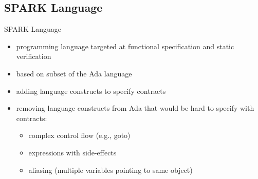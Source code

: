 \subsection{SPARK Language}
\begin{frame}{\insertsubsection}
	\begin{fancycolumns}[animation=none,widths={60}]
		\begin{definition}{SPARK Language \mysource{\introtospark}}
			\begin{itemize}
				\item programming language targeted at functional specification and static verification
				\item based on subset of the Ada language
				\item adding language constructs to specify contracts
				\item removing language constructs from Ada that would be hard to specify with contracts:
					\begin{itemize}
						\item complex control flow (e.g., goto)
						\item expressions with side-effects
						\item aliasing (multiple variables pointing to same object)
					\end{itemize}
			\end{itemize}
		\end{definition}
	\nextcolumn
		\vspace*{-5mm}
		\vspace*{-4mm}
	\end{fancycolumns}
\end{frame}

